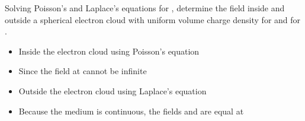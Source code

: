 
\begin{ELexample}{}

Solving Poisson's and Laplace's equations for , determine the field  inside and outside a spherical electron cloud with uniform volume charge density  for  and  for .

\begin{ELsolution}

\begin{itemize}
\tightlist
\item
  Inside the electron cloud \ELim{\ELto} using Poisson's equation
\end{itemize}


\begin{itemize}
\tightlist
\item
  Since the field at  cannot be infinite
\end{itemize}


\begin{itemize}
\tightlist
\item
  Outside the electron cloud \ELim{\ELto} using Laplace's equation
\end{itemize}


\begin{itemize}
\tightlist
\item
  Because the medium is continuous, the fields  and  are equal at 
\end{itemize}


\end{ELsolution}

\end{ELexample}

